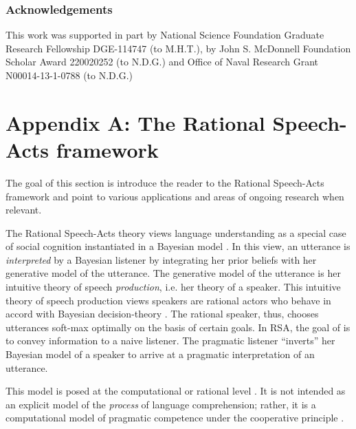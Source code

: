 \documentclass[12pt,letterpaper]{article}
\begin{document}
\subsubsection*{Acknowledgements}

This work was supported in part by National Science Foundation Graduate Research Fellowship DGE-114747 (to M.H.T.),
by John S. McDonnell Foundation Scholar Award 220020252 (to N.D.G.) and 
Office of Naval Research Grant N00014-13-1-0788 (to N.D.G.)

\newpage


\setlength{\bibleftmargin}{.125in}
\setlength{\bibindent}{-\bibleftmargin}



\newpage


\section*{Appendix A: The Rational Speech-Acts framework}

The goal of this section is introduce the reader to the Rational Speech-Acts framework and point to various applications and areas of ongoing research when relevant.

The Rational Speech-Acts theory views language understanding as a special case of social cognition instantiated in a Bayesian model \cite{Frank2012, Goodman2013}. 
In this view, an utterance is \emph{interpreted} by a Bayesian listener by integrating her prior beliefs with her generative model of the utterance.
The generative model of the utterance is her intuitive theory of speech \emph{production}, i.e. her theory of a speaker. 
This intuitive theory of speech production views speakers are rational actors who behave in accord with Bayesian decision-theory \cite{Berger1985}.
The rational speaker, thus, chooses utterances soft-max optimally on the basis of certain goals.
In RSA, the goal of is to convey information to a naive listener. 
The pragmatic listener ``inverts'' her Bayesian model of a speaker to arrive at a pragmatic interpretation of an utterance.

This model is posed at the computational or rational level \cite{Marr1980, Anderson1991}. 
It is not intended as an explicit model of the \emph{process} of language comprehension; rather, it is a computational model of pragmatic competence under the cooperative principle \cite{Grice1975}. 
\end{document}
